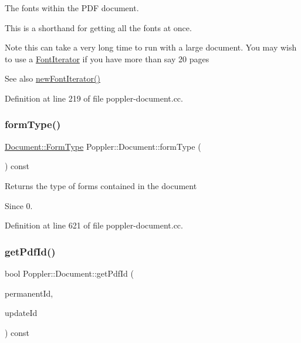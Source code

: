 The fonts within the P\+DF document.

This is a shorthand for getting all the fonts at once.

\begin{DoxyNote}{Note}
this can take a very long time to run with a large document. You may wish to use a \hyperlink{class_poppler_1_1_font_iterator}{Font\+Iterator} if you have more than say 20 pages
\end{DoxyNote}
\begin{DoxySeeAlso}{See also}
\hyperlink{class_poppler_1_1_document_ab7554a98e1cd7b472fe4f1e33565581b}{new\+Font\+Iterator()} 
\end{DoxySeeAlso}


Definition at line 219 of file poppler-\/document.\+cc.

\mbox{\label{class_poppler_1_1_document_a551458a3d6236a1cea3ab24d26953c06}} 
\subsubsection{\texorpdfstring{form\+Type()}{formType()}}
{\footnotesize\ttfamily \hyperlink{class_poppler_1_1_document_ac761c69f98b581e2e027e309b6b9d8b3}{Document\+::\+Form\+Type} Poppler\+::\+Document\+::form\+Type (\begin{DoxyParamCaption}{ }\end{DoxyParamCaption}) const}

Returns the type of forms contained in the document

\begin{DoxySince}{Since}
0. 
\end{DoxySince}


Definition at line 621 of file poppler-\/document.\+cc.

\mbox{\label{class_poppler_1_1_document_a2544975242e00dfb494ecb907e1ac829}} 
\subsubsection{\texorpdfstring{get\+Pdf\+Id()}{getPdfId()}}
{\footnotesize\ttfamily bool Poppler\+::\+Document\+::get\+Pdf\+Id (\begin{DoxyParamCaption}\item[{Q\+Byte\+Array $\ast$}]{permanent\+Id,  }\item[{Q\+Byte\+Array $\ast$}]{update\+Id }\end{DoxyParamCaption}) const}

